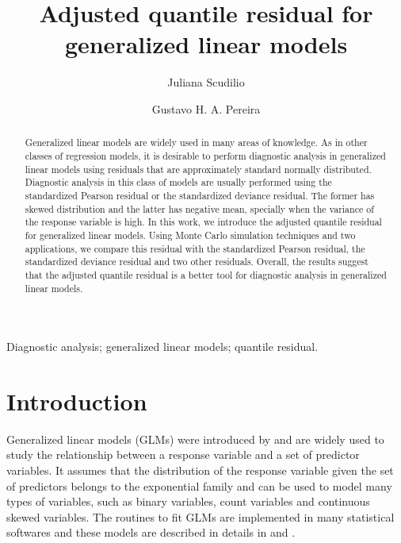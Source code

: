 \documentclass[11pt,authoryear,review,3p,times]{elsarticle}
\begin{document}
		
		\begin{frontmatter}
		\title{{ \LARGE Adjusted quantile residual for generalized linear models }}

		\author{\large Juliana Scudilio }
		\author{\large Gustavo H. A. Pereira}	
	
		\address[label1]{Maths Science Institute and Computing, University of S\~ao Paulo,  S\~ao Carlos, SP, Brazil.}
		\address[label3]{ Department of Statistics, Federal University of S\~ao Carlos,  S\~ao Carlos, SP, Brazil.}
	


\begin{abstract}
Generalized linear models are widely used in many areas of knowledge. As in other classes of regression models, it is desirable to perform diagnostic analysis
in generalized linear models using residuals that are approximately standard normally distributed.
Diagnostic analysis in this class of models are usually performed using the standardized Pearson residual or the standardized deviance residual. The former has skewed distribution and the latter has negative mean, specially when the variance of the response variable is high. In this work, we introduce the adjusted quantile residual for generalized linear models. Using Monte Carlo simulation techniques and two applications, we compare this residual with the standardized Pearson residual, the standardized deviance residual and two other residuals. Overall, the results suggest that the adjusted quantile residual is a better tool for diagnostic analysis in generalized linear models.
\end{abstract}

\begin{keyword}
Diagnostic analysis; generalized linear models; quantile residual.
\end{keyword}
\end{frontmatter}
 

\section{Introduction}

Generalized linear models (GLMs) were introduced by \cite{nelder72} and are widely used to study the relationship between a response
variable and a set of predictor variables. It assumes that the distribution of the response variable given the set of predictors belongs to the exponential family and can be used to model many types of variables, such as binary variables, count variables and continuous skewed variables. The routines to fit GLMs are implemented in many statistical softwares and these models are described in details in \cite{mccullagh} and \cite{hardin2007generalized}.
\end{document}
